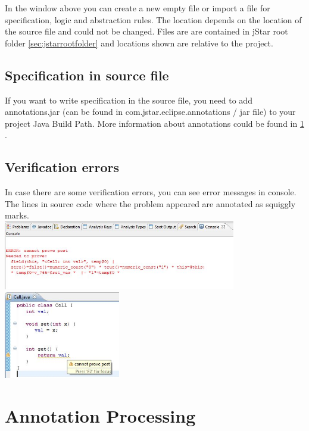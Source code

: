 \documentclass{article}
\begin{document}
In the window above you can create a new empty file or import a file for specification, logic and abstraction rules. The location depends on the location of the source file and could not be changed. Files are  are contained in jStar root folder \ref{sec:jstarrootfolder} and locations shown are relative to the project.

\subsection*{Specification in source file}

If you want to write specification in the source file, you need to add annotations.jar (can be found in com.jstar.eclipse.annotations / jar file) to your project Java Build Path. More information about annotations could be found in \ref{sec:annotationprocessing} .

\subsection* {Verification errors}

In case there are some verification errors, you can see error messages in console. The lines in source code where the problem appeared are annotated as squiggly marks.\\

\includegraphics[width=4in]{images/console.jpg}\\

\includegraphics[width=2in]{images/marker.jpg}

\section{Annotation Processing}
\label{sec:annotationprocessing}
\end{document}
